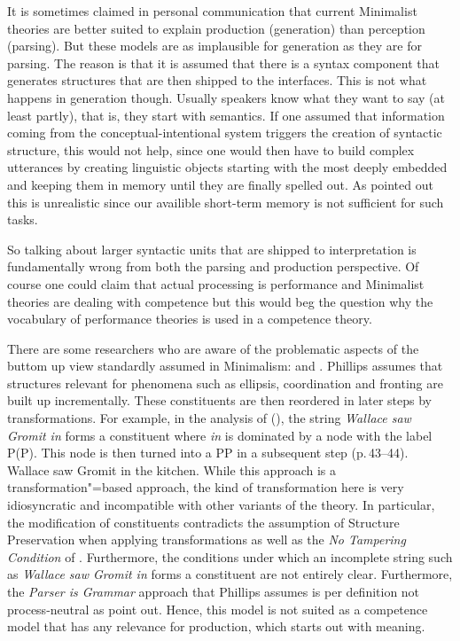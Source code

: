 \documentclass[output=paper]{langsci/langscibook}
\begin{document}
It is sometimes claimed in personal communication that current Minimalist theories are better suited to explain production (generation)
than perception (parsing). But these models are as implausible for generation as they are for parsing. The
reason is that it is assumed that there is a syntax component that generates structures that are
then shipped to the interfaces. This is not what happens in generation though. Usually speakers
know what they want to say (at least partly), that is, they start with semantics. If one assumed
that information coming from the conceptual-intentional system triggers the creation of syntactic
structure, this would not help, since one would then have to build complex utterances by creating
linguistic objects starting with the most deeply embedded and keeping them in memory until they are
finally spelled out. As \citet{Labelle2007a} pointed out this is unrealistic since our availible
short-term memory is not sufficient for such tasks.

So talking about larger syntactic units that are shipped to interpretation is fundamentally
wrong from both the parsing and production perspective. Of course one could claim that actual
processing is performance and Minimalist theories are dealing with competence but this would beg the
question why the vocabulary of performance theories is used in a competence theory. 

There are some researchers who are aware of the problematic aspects of the buttom up view standardly
assumed in Minimalism: \citet{Phillips2003a} and \citet{Chesi2015a-u}. 
Phillips assumes that structures relevant for phenomena such as ellipsis,
coordination and fronting are built up incrementally. These constituents are then
reordered in later steps by transformations. For example, in the analysis of (), the string
\emph{Wallace saw Gromit in} forms a constituent where \emph{in} is dominated by a node with the
label P(P). This node is then turned into a PP in a subsequent step (p.\,43--44).
\ea
Wallace saw Gromit in the kitchen.
\z
While this approach is a transformation"=based approach, the kind of transformation here is very
idiosyncratic and incompatible with other variants of the theory. In particular, the modification of
constituents contradicts the assumption of Structure Preservation when
applying transformations as well as the \emph{No Tampering Condition} of \citet{Chomsky2008a}. Furthermore, the conditions under which an incomplete string such
as \emph{Wallace saw Gromit in} forms a constituent are not entirely clear. Furthermore, the
\emph{Parser is Grammar} approach that Phillips assumes is per definition not
process-neutral as \citet[]{SW2011a} point out. Hence, this model is not suited as a
competence model that has any relevance for production, which starts out with meaning.
\end{document}
